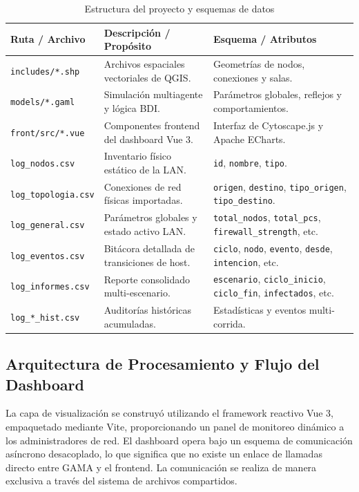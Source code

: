 \begin{table}[htbp]
\caption{Estructura del proyecto y esquemas de datos}
\label{tab:estructura_datos}
\begin{center}
\footnotesize
\setlength{\tabcolsep}{3pt}
\begin{tabular}{|p{2.8cm}|p{2.8cm}|p{2.9cm}|}
\hline
\textbf{Ruta / Archivo} & \textbf{Descripción / Propósito} & \textbf{Esquema / Atributos} \\ \hline
\texttt{includes/*.shp} & Archivos espaciales vectoriales de QGIS. & Geometrías de nodos, conexiones y salas. \\ \hline
\texttt{models/*.gaml} & Simulación multiagente y lógica BDI. & Parámetros globales, reflejos y comportamientos. \\ \hline
\texttt{front/src/*.vue} & Componentes frontend del dashboard Vue 3. & Interfaz de Cytoscape.js y Apache ECharts. \\ \hline
\texttt{log\_nodos.csv} & Inventario físico estático de la LAN. & \texttt{id}, \texttt{nombre}, \texttt{tipo}. \\ \hline
\texttt{log\_topologia.csv} & Conexiones de red físicas importadas. & \texttt{origen}, \texttt{destino}, \texttt{tipo\_origen}, \texttt{tipo\_destino}. \\ \hline
\texttt{log\_general.csv} & Parámetros globales y estado activo LAN. & \texttt{total\_nodos}, \texttt{total\_pcs}, \texttt{firewall\_strength}, etc. \\ \hline
\texttt{log\_eventos.csv} & Bitácora detallada de transiciones de host. & \texttt{ciclo}, \texttt{nodo}, \texttt{evento}, \texttt{desde}, \texttt{intencion}, etc. \\ \hline
\texttt{log\_informes.csv} & Reporte consolidado multi-escenario. & \texttt{escenario}, \texttt{ciclo\_inicio}, \texttt{ciclo\_fin}, \texttt{infectados}, etc. \\ \hline
\texttt{log\_*\_hist.csv} & Auditorías históricas acumuladas. & Estadísticas y eventos multi-corrida. \\ \hline
\end{tabular}
\end{center}
\end{table}

\subsection{Arquitectura de Procesamiento y Flujo del Dashboard}
La capa de visualización se construyó utilizando el framework reactivo Vue 3, empaquetado mediante Vite, proporcionando un panel de monitoreo dinámico a los administradores de red. El dashboard opera bajo un esquema de comunicación asíncrono desacoplado, lo que significa que no existe un enlace de llamadas directo entre GAMA y el frontend. La comunicación se realiza de manera exclusiva a través del sistema de archivos compartidos.

